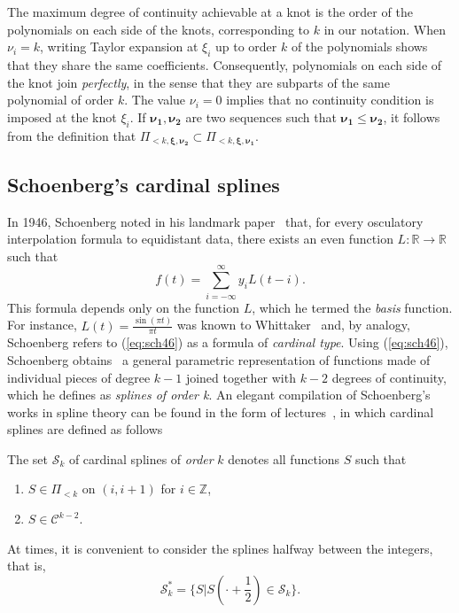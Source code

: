 The maximum degree of continuity achievable at a knot is the order of the polynomials on each side of the knots, 
corresponding to $k$ in our notation. When $\nu_i = k$, writing Taylor expansion at $\xi_i$ up to order $k$ of the 
polynomials shows that they share the same coefficients. Consequently, polynomials on each side of the knot join 
\emph{perfectly}, in the sense that they are subparts of the same polynomial of order $k$. The value $\nu_i=0$ implies 
that no continuity condition is imposed at the knot $\xi_i$.  If $\bm{\nu_1}, \bm{\nu_2}$ are two sequences such that 
$\bm{\nu_1} \leq \bm{\nu_2}$, it follows from the definition that $\Pi_{<k, \bm{\xi}, \bm{\nu_2}} \subset \Pi_{<k, 
\bm{\xi}, \bm{\nu_1}}$. 

\subsection{Schoenberg's cardinal splines}

In 1946, Schoenberg noted in his landmark paper~\cite{schoenberg_contributions_1946} that, for every osculatory 
interpolation formula to equidistant data, there exists an even function $L: \mathbb{R} \to \mathbb{R}$ such that
\begin{equation}\label{eq:sch46}
  f(t) = \sum_{i = -\infty}^{\infty} y_i L(t-i).
\end{equation}
This formula depends only on the function $L$, which he termed the \emph{basis} function. For instance, $L(t) = 
\frac{\sin(\pi t)}{\pi t}$ was known to Whittaker~\cite{whittaker_xviii.functions_1915} and, by analogy, Schoenberg 
refers to (\ref{eq:sch46}) as a formula of \emph{cardinal type}. Using (\ref{eq:sch46}), Schoenberg 
obtains~\cite[Theorem 5]{schoenberg_contributions_1946} a general parametric representation of functions made of 
individual pieces of degree $k-1$ joined together with $k-2$ degrees of continuity, which he defines as \emph{splines of 
order k}. An elegant compilation of Schoenberg's works in spline theory can be found in the form of 
lectures~\cite{schoenberg_cardinal_1973-1}, in which cardinal splines are defined as follows

\begin{deftn}\label{def:card-splines}
  The set $\mathscr{S}_{k}$ of cardinal splines of \emph{order} $k$ denotes all functions $S$ such that
  \begin{enumerate}
    \item $S \in \Pi_{<k}$ on $(i, i+1)$ for $i \in \mathbb{Z}$,
    \item $S \in \mathcal{C}^{k-2}$.
  \end{enumerate}
  At times, it is convenient to consider the splines halfway between the integers, that is,
  \begin{equation*}
    \mathscr{S}^*_k = \{S | S(\cdot + \frac{1}{2}) \in \mathcal{S}_k\}.
  \end{equation*}
\end{deftn}

